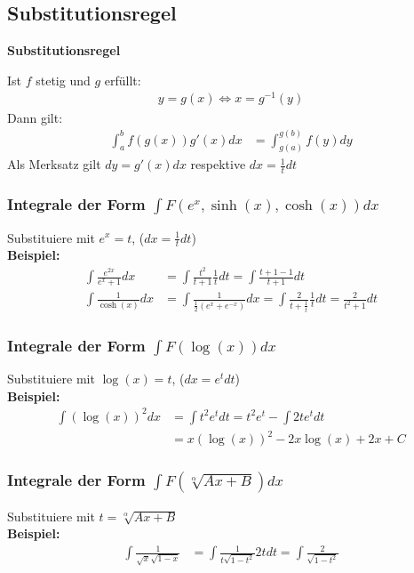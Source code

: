 \documentclass[25pt]{sciposter}
\newenvironment{method}[1]{\begin{mdframed}[backgroundcolor=blue!10,innertopmargin=15pt, innerbottommargin=15pt, nobreak=true]
		\textbf{#1 }
	}
	{ 
	\end{mdframed}
}
\begin{document}
\begin{multicols}{3}
\subsection*{Substitutionsregel}
\begin{method}{Substitutionsregel}
Ist $f$ stetig und $g$ erfüllt:
\begin{align*}
	y = g(x) \iff x = g^{-1}(y)
\end{align*}
Dann gilt:
\begin{align*}
\int_a ^b f(g(x))g'(x) dx &= \int_{g(a)}^{g(b)} f(y) dy
\end{align*}
Als Merksatz gilt $dy = g'(x) dx$ respektive $dx = \frac{1}{t} dt$
\end{method}

\subsubsection*{Integrale der Form $\int F(e^x, \sinh(x), \cosh(x)) dx$}
Substituiere mit $e^x = t$, ($dx = \frac{1}{t} dt$)\\
\textbf{Beispiel:}
\begin{align*}
	\int \frac{e^{2x}}{e^x + 1} dx &= \int \frac{t^2}{t + 1 } \frac{1}{t} dt = \int\frac{t +1 - 1}{t+1} dt\\
	\int \frac{1}{\cosh(x)} dx &= \int \frac{1}{\frac{1}{2} (e^x + e^{-x})} dx = \int \frac{2}{t + \frac{1}{t}} \frac{1}{t} dt = \frac{2}{t^2 + 1} dt
\end{align*}

\subsubsection*{Integrale der Form $\int F(\log(x)) dx$}
Substituiere mit $\log(x) = t$, ($dx = e^t dt$)\\
\textbf{Beispiel:}
\begin{align*}
	\int (\log(x))^2 dx &= \int t^2 e^t dt = t^2 e^t - \int 2t e^t dt  \\
	&= x(\log(x))^2 -2x\log(x) + 2x + C
\end{align*}

\subsubsection*{Integrale der Form $\int F(\sqrt[\alpha]{Ax + B}) dx$}
Substituiere mit $t = \sqrt[\alpha]{Ax + B}$\\
\textbf{Beispiel:}
\begin{align*}
	\int \frac{1}{\sqrt{x} \sqrt{1-x}} &= \int \frac{1}{t \sqrt{1-t^2}} 2t dt = \int \frac{2}{\sqrt{1-t^2}}
\end{align*}


\end{multicols}
\end{document}
